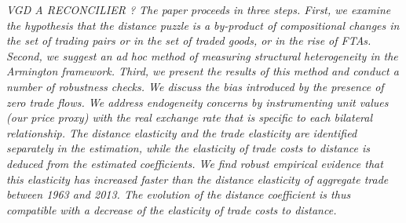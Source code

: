 \documentclass[12pt,twoside,a4paper,notitlepage]{article}
\begin{document}
\emph{VGD A RECONCILIER ? The paper proceeds in three steps. First, we examine the hypothesis that the distance puzzle is a by-product of compositional changes in the set of trading pairs or in the set of traded goods, or in the rise of FTAs. Second, we suggest an ad hoc method of measuring structural heterogeneity in the Armington framework. Third, we present the results of this method and conduct a number of robustness checks. We discuss the bias introduced by the presence of zero trade flows. We address endogeneity concerns by instrumenting unit values (our price proxy) with the real exchange rate that is specific to each bilateral relationship. The distance elasticity and the trade elasticity are identified separately in the estimation, while the elasticity of trade costs to distance is deduced from the estimated coefficients. We find robust empirical evidence that this elasticity has increased faster than the distance elasticity of aggregate trade between 1963 and 2013. The evolution of the distance coefficient is thus compatible with a decrease of the elasticity of trade costs to distance.}

\end{document}
